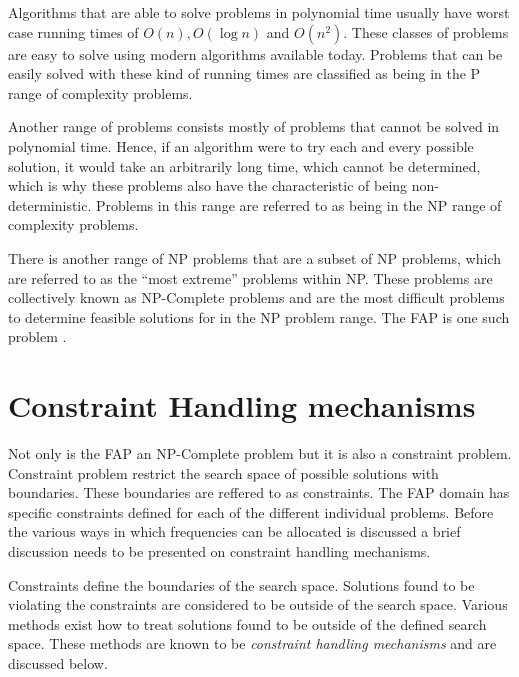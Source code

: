 Algorithms that are able to solve problems in polynomial time usually have worst case running times of $O(n),O(\log n)$ and $O(n^2)$\cite{AIModernApproach}. These classes of problems are easy to solve using modern algorithms available today. Problems that can be easily solved with these kind of running times are classified as being in the P range of complexity problems\cite{AIModernApproach}.

Another range of problems consists mostly of problems that cannot be solved in polynomial time\cite{AIModernApproach}. Hence, if an algorithm were to try each and every possible solution, it would take an arbitrarily long time, which cannot be determined, which is why these problems also have the characteristic of being non-deterministic\cite{AIModernApproach}. Problems in this range are referred to as being in the NP range of complexity problems\cite{AIModernApproach}.

There is another range of NP problems that are a subset of NP problems, which are referred to as the ``most extreme'' problems within NP\@.  These problems are collectively known as NP-Complete problems and are the most difficult problems to determine feasible solutions for in the NP problem range\cite{AIModernApproach}. The \gls{FAP} is one such problem \cite{AndreasPaper,FixedFAPPSO}.

\section{Constraint Handling mechanisms}
\label{sec:chm}
Not only is the \gls{FAP} an NP-Complete problem but it is also a constraint problem. Constraint problem restrict the search space of possible solutions with boundaries. These boundaries are reffered to as constraints. The \gls{FAP} domain has specific constraints defined for each of the different individual problems. Before the various ways in which frequencies can be allocated is discussed a brief discussion needs to be presented on constraint handling mechanisms.

Constraints define the boundaries of the search space. Solutions found to be violating the constraints are considered to be outside of the search space. Various methods exist how to treat solutions found to be outside of the defined search space. These methods are known to be \emph{constraint handling mechanisms} and are discussed below.

